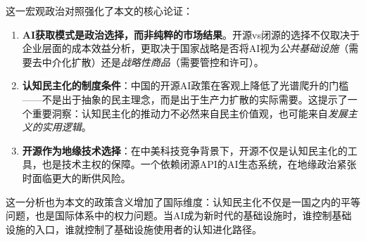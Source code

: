 这一宏观政治对照强化了本文的核心论证：

\begin{enumerate}
\item \textbf{AI获取模式是政治选择，而非纯粹的市场结果}。开源vs闭源的选择不仅取决于企业层面的成本效益分析，更取决于国家战略是否将AI视为\textit{公共基础设施}（需要去中介化扩散）还是\textit{战略性商品}（需要管控和许可）。
\item \textbf{认知民主化的制度条件}：中国的开源AI政策在客观上降低了光谱爬升的门槛——不是出于抽象的民主理念，而是出于生产力扩散的实际需要。这提示了一个重要洞察：认知民主化的推动力不必然来自民主价值观，也可能来自\textit{发展主义的实用逻辑}。
\item \textbf{开源作为地缘技术选择}：在中美科技竞争背景下，开源不仅是认知民主化的工具，也是技术主权的保障。一个依赖闭源API的AI生态系统，在地缘政治紧张时面临更大的断供风险。
\end{enumerate}

这一分析也为本文的政策含义增加了国际维度：认知民主化不仅是一国之内的平等问题，也是国际体系中的权力问题。当AI成为新时代的基础设施时，谁控制基础设施的入口，谁就控制了基础设施使用者的认知进化路径。
